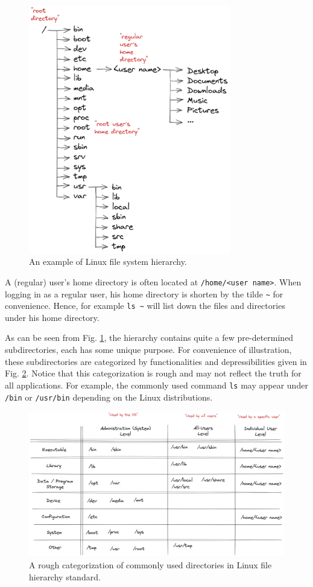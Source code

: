 \begin{figure}
	\centering
	\includegraphics[width=250pt]{chapters/ch-file-management/figures/linux_file_hierarchy.png}
	\caption{An example of Linux file system hierarchy.} \label{ch:fm:fig:hierarchy}
\end{figure}

A (regular) user's home directory is often located at \verb|/home/<user name>|. When logging in as a regular user, his home directory is shorten by the tilde \verb|~| for convenience. Hence, for example \verb|ls ~| will list down the files and directories under his home directory.

As can be seen from Fig. \ref{ch:fm:fig:hierarchy}, the hierarchy contains quite a few pre-determined subdirectories, each has some unique purpose. For convenience of illustration, these subdirectories are categorized by functionalities and depressibilities given in Fig. \ref{ch:fm:fig:directorycate}. Notice that this categorization is rough and may not reflect the truth for all applications. For example, the commonly used command \verb|ls| may appear under \verb|/bin| or \verb|/usr/bin| depending on the Linux distributions.

\begin{figure}
	\centering
	\includegraphics[width=350pt]{chapters/ch-file-management/figures/linux_directory_cate.png}
	\caption{A rough categorization of commonly used directories in Linux file hierarchy standard.} \label{ch:fm:fig:directorycate}
\end{figure}


